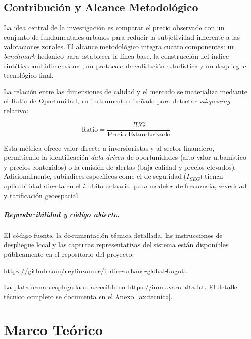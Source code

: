 \documentclass[12pt, a4paper, twoside, openright]{report}
\theoremstyle{plain}
\theoremstyle{definition}
\newcommand{\IUG}{IUG}             %
\begin{document}
\section{Contribución y Alcance Metodológico}

La idea central de la investigación es comparar el precio observado con un conjunto de fundamentales urbanos para reducir la subjetividad inherente a las valoraciones zonales. El alcance metodológico integra cuatro componentes: un \emph{benchmark} hedónico para establecer la línea base, la construcción del índice sintético multidimensional, un protocolo de validación estadística y un despliegue tecnológico final.

La relación entre las dimensiones de calidad y el mercado se materializa mediante el Ratio de Oportunidad, un instrumento diseñado para detectar \emph{mispricing} relativo:

\begin{equation}
    \text{Ratio} = \frac{\IUG{}}{\text{Precio Estandarizado}}
\end{equation}

Esta métrica ofrece valor directo a inversionistas y al sector financiero, permitiendo la identificación \emph{data-driven} de oportunidades (alto valor urbanístico y precios contenidos) o la emisión de alertas (baja calidad y precios elevados). Adicionalmente, subíndices específicos como el de seguridad ($I_{SEG}$) tienen aplicabilidad directa en el ámbito actuarial para modelos de frecuencia, severidad y tarificación geoespacial.

\paragraph{Reproducibilidad y código abierto.} El código fuente, la documentación técnica detallada, las instrucciones de despliegue local y las capturas representativas del sistema están disponibles públicamente en el repositorio del proyecto:

\begin{center}
\url{https://github.com/neylinsomne/indice-urbano-global-bogota}
\end{center}

\noindent La plataforma desplegada es accesible en \url{https://inmu.vara-alta.lat}. El detalle técnico completo se documenta en el Anexo~\ref{ax:tecnico}.
\chapter{Marco Teórico}\label{ch:marco_teorico}
\end{document}
